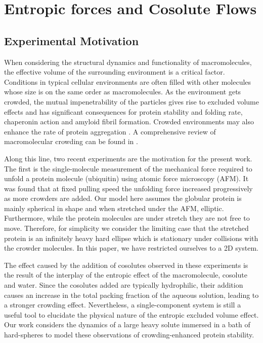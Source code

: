 \chapter{Entropic forces and Cosolute Flows}
\label{chap:entropic_force}

\section{Experimental Motivation}
When considering the structural dynamics and functionality of macromolecules, the effective volume of the surrounding environment is a  critical factor. Conditions in typical cellular environments are often filled with other molecules whose size is on the same order as macromolecules. As the environment gets crowded, the mutual impenetrability of the particles gives rise to excluded volume effects and has significant consequences for protein stability and folding rate,\cite{minton_can_2006, ping_depletion_2006, rosgen_protein_2005, pincus_crowding_2009, cheung_effects_2007, cheung_molecular_2005, stagg_molecular_2007, minton_models_2005, sasahara_effect_2003} chaperonin action\cite{zhou_protein_2004} and amyloid fibril formation.\cite{kinoshita_ordered_2004} Crowded environments may also enhance the rate of protein aggregation \cite{ellis_protein_2006}. A comprehensive review of macromolecular crowding can be found in \cite{huan-xiang_zhou_macromolecular_2008}. 

Along this line, two recent experiments are the motivation for the present work. The first is the single-molecule measurement of the mechanical force required to unfold a protein molecule (ubiquitin) using atomic force microscopy (AFM). It was found that at fixed pulling speed the unfolding force increased progressively as more crowders are added.\cite{yuan_effects_2008} Our model here assumes the globular protein is mainly spherical in shape and when stretched under the AFM, elliptic. Furthermore, while the protein molecules are under stretch they are not free to move. Therefore, for simplicity we consider the limiting case that the stretched protein is an infinitely heavy hard ellipse which is stationary under collisions with the crowder molecules. In this paper, we have restricted ourselves to a 2D system. 

The effect caused by the addition of cosolutes observed in these experiments is the result of the interplay of the entropic effect of the macromolecule, cosolute and water. Since the cosolutes added are typically hydrophilic, their addition causes an increase in the total packing fraction of the aqueous solution, leading to a stronger crowding effect.\cite{akiyama_remarkable_2006} Nevertheless, a single-component system is still a useful tool to elucidate the physical nature of the entropic excluded volume effect. Our work considers the dynamics of a large heavy solute immersed in a bath of hard-spheres to model these observations of crowding-enhanced protein stability.

